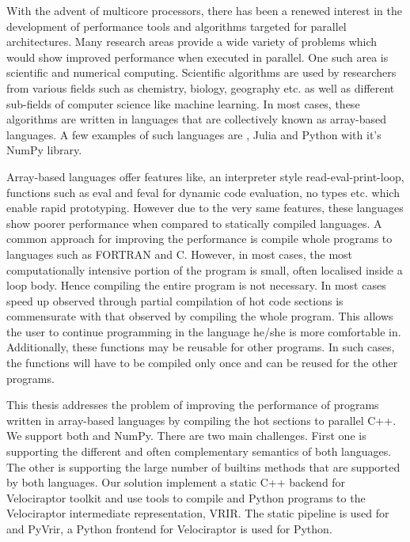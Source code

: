 With the advent of multicore processors, there has been a renewed interest in the development of performance tools and algorithms targeted for parallel architectures. Many research areas  provide a wide variety of problems which would show improved performance when executed in parallel. One such area is scientific and numerical computing. Scientific algorithms are used by researchers from various fields such as chemistry, biology, geography etc. as well as different sub-fields of computer science like machine learning. In most cases, these algorithms are written in languages  that are collectively known as  array-based languages. A few examples of such languages are \matlab\cite{matlab}, Julia\cite{julia} and Python\cite{python} with it's NumPy\cite{numpy} library. 

Array-based languages offer features like, an interpreter style read-eval-print-loop, functions such as eval and feval for dynamic code evaluation, no types etc. which enable rapid prototyping. However due to the very same features, these languages show poorer performance when compared to statically compiled languages. A common approach for improving the performance is compile whole programs to languages such as {\sc FORTRAN}\cite{fortran} and C\cite{clang}. 
However, in most cases, the most computationally intensive portion of the program is small, often localised inside a loop body. Hence compiling the entire program is not necessary. In most cases speed up observed through partial compilation of hot code sections is commensurate with that observed by compiling the whole program. This allows the user to continue programming in the language he/she is more comfortable in. Additionally, these functions may be reusable for other programs. In such cases, the functions will have to be compiled only once and can be reused for the other programs. 

This thesis addresses the problem of improving the performance of programs written in array-based languages by compiling the hot sections to parallel C++\cite{cpp}. We support both \matlab and NumPy. There are two main challenges. First one is supporting the different and often complementary semantics of both languages. The other is supporting the large number of builtins methods that are supported by both languages.
Our solution implement a static C++ backend for Velociraptor\cite{velociraptor} toolkit and use tools to compile \matlab and Python programs to the Velociraptor intermediate representation, VRIR. The \mclab\cite{casey:mclab} static pipeline is used for \matlab and PyVrir, a Python frontend for Velociraptor is used for Python. 
